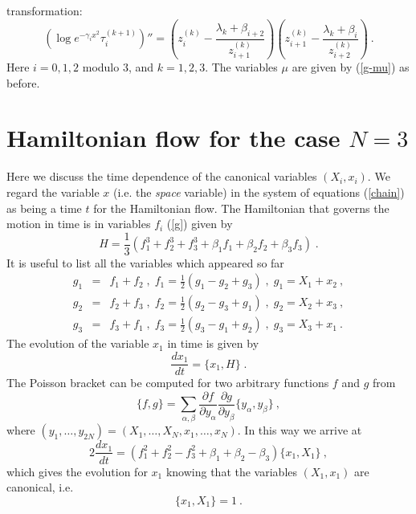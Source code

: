 \documentclass[a4paper,11pt]{article}
\begin{document}
transformation:
    $$
    \left( \log e^{-\gamma_i x^2} \tau_i^{(k+1)} \right) ''
    = \left( z_{i}^{(k)} - \frac{\lambda_k + \beta_{i+2}}{z_{i+1}^{(k)}} \right)
      \left( z_{i+1}^{(k)} - \frac{\lambda_k + \beta_i}{z_{i+2}^{(k)}} \right)~.
    $$
Here $i=0,1,2$ modulo $3$, and $k=1,2,3$.
The variables $\mu$ are given by (\ref{g-mu}) as before.

\section{Hamiltonian flow for the case $N=3$}
Here we discuss the time dependence of the canonical variables $(X_i,x_i).$
We regard the variable $x$ (i.e. the {\it space} variable) in the system of
equations (\ref{chain}) as being a time $t $ for the Hamiltonian flow. The
Hamiltonian that governs the motion in time is in variables $f_i$ (\ref{g})
given by
\begin{equation}
\label{Ham_3}
H=\frac{1}{3}(f_1^3+f_2^3+f_3^3+\beta_1f_1+\beta_2f_2+\beta_3f_3)\;.
\end{equation}
It is useful to list all the variables which appeared so far
\begin{eqnarray}
\label{g_f}
g_1 \!\!\!&=&\!\!\! f_1+f_2\;,\;f_1=\frac{1}{2}(g_1-g_2+g_3)\;,\;g_1=X_1+x_2 ~,\\
g_2 \!\!\!&=&\!\!\! f_2+f_3\;,\;f_2=\frac{1}{2}(g_2-g_3+g_1)\;,\;g_2=X_2+x_3 ~,\\
g_3 \!\!\!&=&\!\!\! f_3+f_1\;,\;f_3=\frac{1}{2}(g_3-g_1+g_2)\;,\;g_3=X_3+x_1 ~.
\end{eqnarray}
The evolution of the variable $x_1$ in time is given by
\begin{equation}
\label{ev_x}
\frac{dx_1}{dt}=\{x_1,H\}\;.
\end{equation}
The Poisson bracket can be computed for two arbitrary functions $f$ and $g$
from
\begin{equation}
\label{Pois}
\{f,g\}=\sum_{\alpha ,\beta}\frac{\partial f}{\partial y_\alpha }
   \frac{\partial g}{\partial y_\beta }\{y_{\alpha},y_{\beta }\} ~,
\end{equation}
where $(y_1,\ldots,y_{2N})=(X_1,\ldots ,X_N,x_1,\ldots,x_N)$. In this way we
arrive at
\begin{equation}
\label{Poi_x}
2\frac{dx_1}{dt}=(f_1^2+f_2^2-f_3^2+\beta _1+\beta _2-\beta _3)\{x_1,X_1\} ~,
\end{equation}
which gives the evolution for $x_1$ knowing that the variables $(X_1,x_1)$
are canonical, i.e.
\begin{equation}
\label{ca}
\{x_1,X_1\}=1 ~.
\end{equation}
\end{document}
